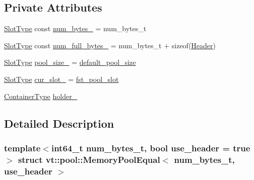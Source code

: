 \subsection*{Private Attributes}
\begin{DoxyCompactItemize}
\item 
\hyperlink{structvt_1_1pool_1_1_memory_pool_equal_af05a2c24c95c666b20e3758745be746b}{Slot\+Type} const \hyperlink{structvt_1_1pool_1_1_memory_pool_equal_a50e14945e15e2ab88319e347c2a3f1b7}{num\+\_\+bytes\+\_\+} = num\+\_\+bytes\+\_\+t
\item 
\hyperlink{structvt_1_1pool_1_1_memory_pool_equal_af05a2c24c95c666b20e3758745be746b}{Slot\+Type} const \hyperlink{structvt_1_1pool_1_1_memory_pool_equal_a70c83d8bfd3a1c0c8f2c1a4a27e2aa04}{num\+\_\+full\+\_\+bytes\+\_\+} = num\+\_\+bytes\+\_\+t + sizeof(\hyperlink{structvt_1_1pool_1_1_header}{Header})
\item 
\hyperlink{structvt_1_1pool_1_1_memory_pool_equal_af05a2c24c95c666b20e3758745be746b}{Slot\+Type} \hyperlink{structvt_1_1pool_1_1_memory_pool_equal_a25a2b249ba0983b65ec1e2877dbd4f19}{pool\+\_\+size\+\_\+} = \hyperlink{structvt_1_1pool_1_1_memory_pool_equal_a8daca02e94e9ab587670808525561c71}{default\+\_\+pool\+\_\+size}
\item 
\hyperlink{structvt_1_1pool_1_1_memory_pool_equal_af05a2c24c95c666b20e3758745be746b}{Slot\+Type} \hyperlink{structvt_1_1pool_1_1_memory_pool_equal_aeb14c73621125dc7d9179833bbc780a7}{cur\+\_\+slot\+\_\+} = \hyperlink{structvt_1_1pool_1_1_memory_pool_equal_a11e4d0dbd2ea5c1f93fa8cdf36c1e60a}{fst\+\_\+pool\+\_\+slot}
\item 
\hyperlink{structvt_1_1pool_1_1_memory_pool_equal_a3f343f1f8f74e333c8fffad7698c85f1}{Container\+Type} \hyperlink{structvt_1_1pool_1_1_memory_pool_equal_a901b7dfe76a139d533e80fec478235c8}{holder\+\_\+}
\end{DoxyCompactItemize}


\subsection{Detailed Description}
\subsubsection*{template$<$int64\+\_\+t num\+\_\+bytes\+\_\+t, bool use\+\_\+header = true$>$\newline
struct vt\+::pool\+::\+Memory\+Pool\+Equal$<$ num\+\_\+bytes\+\_\+t, use\+\_\+header $>$}

